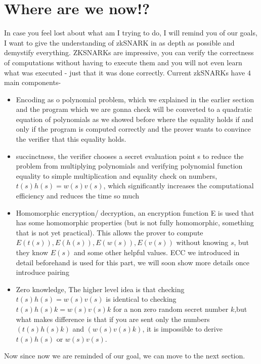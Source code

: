 \documentclass[12pt,letterpaper]{article}
\begin{document}
\section{Where are we now!?}
In case you feel lost about what am I trying to do, I will remind you of our goals, I want to give the understanding of zkSNARK in as depth as possible and demystify everything. ZKSNARKs are impressive, you can verify the correctness of computations without having to execute them and you will not even learn what was executed - just that it was done correctly. Current zkSNARKs have $4$ main components- 
\begin{itemize}
    \item Encoding as o polynomial problem, which we explained in the earlier section and the program which we are gonna check will be converted to a quadratic equation of polynomials as we showed before where the equality holds if and only if the program is computed correctly and the prover wants to convince the verifier that this equality holds.
    \item succinctness, the verifier chooses a secret evaluation point s to reduce the problem from multiplying polynomials and verifying polynomial function equality to simple multiplication and equality check on numbers, $t(s)h(s) = w(s)v(s)$, which significantly increases the computational efficiency and reduces the time so much
    \item Homomorphic encryption/ decryption, an encryption function E is used that has some homomorphic properties (but is not fully homomorphic, something that is not yet practical). This allows the prover to compute $E(t(s)), E(h(s)), E(w(s)), E(v(s))$ without knowing $s$, but they know $E(s)$ and some other helpful values. ECC we introduced in detail beforehand is used for this part, we will soon show more details once introduce pairing
    \item Zero knowledge, The higher level idea is that checking $t(s)h(s) = w(s)v(s)$ is identical to checking $t(s)h(s) k = w(s)v(s)k$ for a non zero random secret number $k$,but what makes difference is that if you are sent only the numbers $(t(s)h(s) k)$ and $(w(s)v(s) k)$, it is impossible to derive $t(s)h(s)$ or $w(s)v(s)$.
\end{itemize}
Now since now we are reminded of our goal, we can move to the next section.
\end{document}
